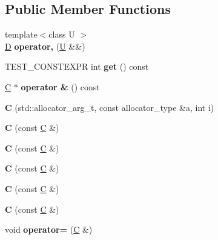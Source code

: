 \subsection*{Public Member Functions}
\begin{DoxyCompactItemize}
\item 
\mbox{\label{struct_c_aa723cfe1117dab98d70877c703bb51e4}} 
{\footnotesize template$<$class U $>$ }\\\mbox{\hyperlink{struct_d}{D}} {\bfseries operator,} (\mbox{\hyperlink{union_u}{U}} \&\&)
\item 
\mbox{\label{struct_c_a4e694c4017f11562321c16b7fb1e05c8}} 
T\+E\+S\+T\+\_\+\+C\+O\+N\+S\+T\+E\+X\+PR int {\bfseries get} () const
\item 
\mbox{\label{struct_c_aafb7a0bfe527ddb9acfb30e57947bd72}} 
\mbox{\hyperlink{struct_c}{C}} $\ast$ {\bfseries operator \&} () const
\item 
\mbox{\label{struct_c_a3ab39660f85ade1df04ea230193aceb6}} 
{\bfseries C} (std\+::allocator\+\_\+arg\+\_\+t, const allocator\+\_\+type \&a, int i)
\item 
\mbox{\label{struct_c_acfb6adeb1b34621444c8564377749b77}} 
{\bfseries C} (const \mbox{\hyperlink{struct_c}{C}} \&)
\item 
\mbox{\label{struct_c_acfb6adeb1b34621444c8564377749b77}} 
{\bfseries C} (const \mbox{\hyperlink{struct_c}{C}} \&)
\item 
\mbox{\label{struct_c_acfb6adeb1b34621444c8564377749b77}} 
{\bfseries C} (const \mbox{\hyperlink{struct_c}{C}} \&)
\item 
\mbox{\label{struct_c_acfb6adeb1b34621444c8564377749b77}} 
{\bfseries C} (const \mbox{\hyperlink{struct_c}{C}} \&)
\item 
\mbox{\label{struct_c_acfb6adeb1b34621444c8564377749b77}} 
{\bfseries C} (const \mbox{\hyperlink{struct_c}{C}} \&)
\item 
\mbox{\label{struct_c_a0e102e04676b8089288d6a09e93932fc}} 
void {\bfseries operator=} (\mbox{\hyperlink{struct_c}{C}} \&)

\end{DoxyCompactItemize}
